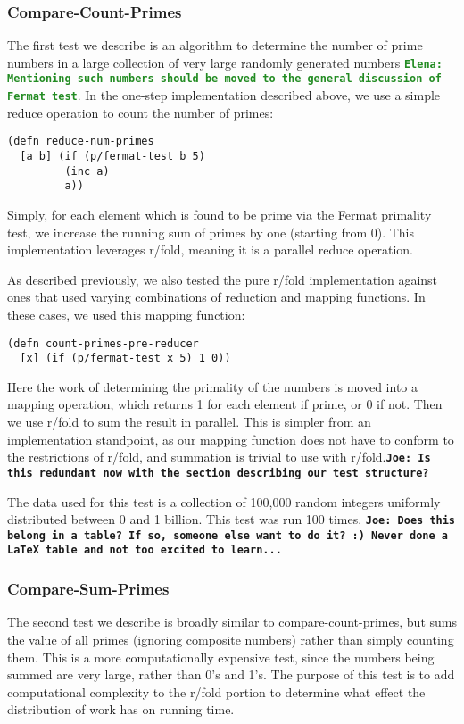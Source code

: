 \documentclass[12pt]{article}
\newcommand{\comment}[1]{{\bf \tt  {#1}}}
\newcommand{\emcomment}[1]{\textcolor{ForestGreen}{\comment{Elena: {#1}}}}
\newcommand{\joecomment}[1]{\textcolor{JoesGold}{\comment{Joe: {#1}}}}
\begin{document}
\subsubsection{Compare-Count-Primes}\label{sec:count-primes}
The first test we describe is an algorithm to determine the number of prime numbers in a large collection of very large randomly generated numbers \emcomment{Mentioning such numbers should be moved to the general discussion of Fermat test}. In the one-step implementation described above, we use a simple reduce operation to count the number of primes:

\begin{verbatim}
(defn reduce-num-primes
  [a b] (if (p/fermat-test b 5)
         (inc a)
         a))
\end{verbatim}

Simply, for each element which is found to be prime via the Fermat primality test, we increase the running sum of primes by one (starting from 0). This implementation leverages r/fold, meaning it is a parallel reduce operation. 

As described previously, we also tested the pure r/fold implementation against ones that used varying combinations of reduction and mapping functions. In these cases, we used this mapping function:

\begin{verbatim}
(defn count-primes-pre-reducer
  [x] (if (p/fermat-test x 5) 1 0))
\end{verbatim}

Here the work of determining the primality of the numbers is moved into a mapping operation, which returns 1 for each element if prime, or 0 if not. Then we use r/fold to sum the result in parallel. This is simpler from an implementation standpoint, as our mapping function does not have to conform to the restrictions of r/fold, and summation is trivial to use with r/fold.\joecomment{Is this redundant now with the section describing our test structure?}

The data used for this test is a collection of 100,000 random integers uniformly distributed between 0 and 1 billion. This test was run 100 times. \joecomment{Does this belong in a table? If so, someone else want to do it? :) Never done a LaTeX table and not too excited to learn...}

  
\subsubsection{Compare-Sum-Primes}\label{sec:sum-primes}
The second test we describe is broadly similar to compare-count-primes, but sums the value of all primes (ignoring composite numbers) rather than simply counting them. This is a more computationally expensive test, since the numbers being summed are very large, rather than 0's and 1's. The purpose of this test is to add computational complexity to the r/fold portion to determine what effect the distribution of work has on running time.
\end{document}
